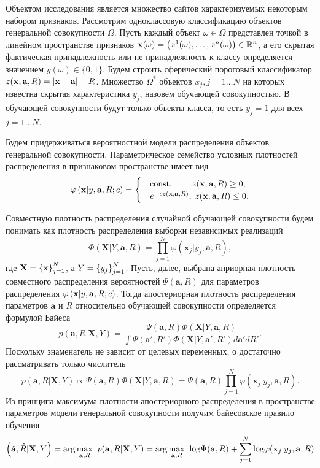 Объектом исследования является множество сайтов характеризуемых некоторым набором признаков.
Рассмотрим одноклассовую классификацию объектов генеральной совокупности $\Omega$.
Пусть каждый объект $\omega \in{\Omega}$  представлен точкой в линейном пространстве признаков
$\mathbf{x}(\omega)=\left(x^1(\omega),\ldots, x^n(\omega)\right) \in {\mathbb{R}^n}$,
а его скрытая фактическая принадлежность или не принадлежность к классу
определяется значением $y(\omega)\in{\{0,1\}}$. Будем строить сферический пороговый классификатор
$z(\mathbf{x},\mathbf{a},R)=\left|\mathbf{x}-\mathbf{a}\right|-R$. Множество $\Omega^*$ объектов 
$x_j, j=1 \ldots N$ на которых известна скрытая характеристика $y_j$, назовем обучающей совокупностью. 
В обучающей совокупности будут только объекты класса, то есть $y_j=1$ для всех $j=1\ldots N$.


Будем придерживаться вероятностной модели распределения объектов генеральной совокупности. 
Параметрическое семейство условных плотностей распределения в признаковом пространстве имеет вид 
\begin{equation}
\label{prob1}
	\varphi \cbr{ {\mathbf x | y,\mathbf{a},R;c} } =
	\begcas{
		&\text{const},		\qquad\,					z(\mathbf{x},\mathbf{a},R) \geq 0, \\
		&e^{-c z(\mathbf{x},\mathbf{a},R)},\;	z(\mathbf{x},\mathbf{a},R) \leq 0.
	} 
\vspace{-5pt}
\end{equation}


Совместную плотность распределения случайной обучающей совокупности будем понимать как плотность 
распределения выборки независимых реализаций
$$\Phi(\mathbf{X}|Y,\mathbf{a},R)=\prod \limits_{j=1}^N \varphi(\mathbf{x}_j|y_j,\mathbf{a},R),$$ 
где $\mathbf{X}= \left\{\mathbf{x}\right\}_{j=1}^N$, а $Y = \left\{y_j\right\}_{j=1}^N$.
Пусть, далее, выбрана априорная плотность совместного распределения вероятностей $\Psi(\mathbf{a},R)$ 
для параметров распределения $\varphi \left(\mathbf x | y,\mathbf{a},R;c\right)$. Тогда апостериорная
 плотность распределения параметров $\mathbf{a}$ и $R$ относительно обучающей совокупности определяется 
формулой Байеса
$$p(\mathbf{a},R|\mathbf{X},Y)=\frac{\Psi(\mathbf{a},R) \Phi(\mathbf{X}|Y,\mathbf{a},R)}
{\int {\Psi(\mathbf{a}',R') \Phi(\mathbf{X}|Y,\mathbf{a}',R')d\mathbf{a}'dR'}}.$$
Поскольку знаменатель не зависит от целевых переменных, о достаточно рассматривать только числитель
$$p(\mathbf{a},R|\mathbf{X},Y) \propto \Psi(\mathbf{a},R) \Phi(\mathbf{X}|Y,\mathbf{a},R) = 
\Psi(\mathbf{a},R) \prod \limits_{j=1}^N \varphi(\mathbf{x}_j|y_j,\mathbf{a},R).$$
Из принципа максимума плотности апостериорного распределения в пространстве параметров модели генеральной
 совокупности получим байесовское правило обучения
$$\left(\hat{\mathbf{a}},\hat{R}|\mathbf{X},Y\right)
	= \arg\underset{\mathbf{a},R}{\max}\;\; p(\mathbf{a},R|\mathbf{X},Y) 
	= \arg\underset{\mathbf{a},R}{\max}\;\; {\log}\Psi(\mathbf{a},R) + \sum\limits_{j=1}^N{\log}\varphi(\mathbf{x}_j|y_j,\mathbf{a},R) $$


